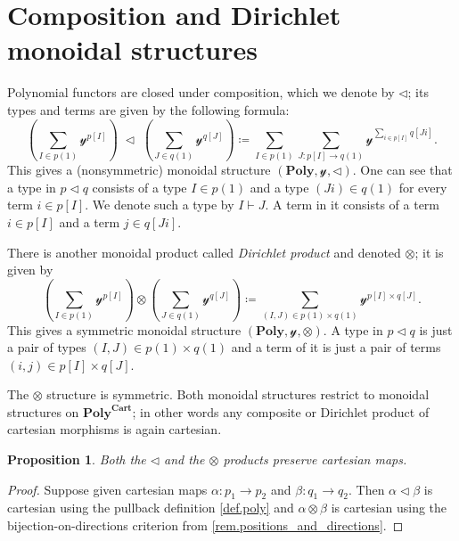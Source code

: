 \documentclass[11pt, one side, article]{memoir}
\theoremstyle{definition}
\theoremstyle{plain}
\newtheorem{proposition}[definitionx]{Proposition}
\newcommand{\Cat}[1]{\mathbf{#1}}%
\newcommand{\yon}{\mathcal{y}}
\newcommand{\poly}{\Cat{Poly}}
\newcommand{\polycart}{\poly^{\Cat{Cart}}}
\newcommand{\0}{\textsf{0}}
\newcommand{\1}{\tn{\textsf{1}}}
\newcommand{\tri}{\mathbin{\triangleleft}}
\begin{document}
\section{Composition and Dirichlet monoidal structures}

Polynomial functors are closed under composition, which we denote by $\tri$; its types and terms are given by the following formula:
\begin{equation}\label{eqn.comp_formula}
  \left(\sum_{I\in p(1)}\yon^{p[I]}\right)\;\tri\;
  \left(\sum_{J\in q(1)}\yon^{q[J]}\right)\coloneqq
  \sum_{I\in p(1)}\sum_{J\colon p[I]\to q(1)}\yon^{\sum_{i\in p[I]}q[J i]}.
\end{equation}
This gives a (nonsymmetric) monoidal structure $(\poly,\yon,\tri)$. One can see that a type in $p\tri q$ consists of a type $I\in p(1)$ and a type $(J i)\in q(1)$ for every term $i\in p[I]$. We denote such a type by $I\vdash J$. A term in it consists of a term $i\in p[I]$ and a term $j\in q[J i]$.

There is another monoidal product called \emph{Dirichlet product} and denoted $\otimes$; it is given by
\begin{equation}\label{eqn.dir_formula}
  \left(\sum_{I\in p(1)}\yon^{p[I]}\right)\otimes
  \left(\sum_{J\in q(1)}\yon^{q[J]}\right)\coloneqq
  \sum_{(I,J)\in p(1)\times q(1)}\yon^{p[I]\times q[J]}.
\end{equation}
This gives a symmetric monoidal structure $(\poly,\yon,\otimes)$. A type in $p\tri q$ is just a pair of types $(I,J)\in p(1)\times q(1)$ and a term of it is just a pair of terms $(i,j)\in p[I]\times q[J]$.

The $\otimes$ structure is symmetric. Both monoidal structures restrict to monoidal structures on $\polycart$; in other words any composite or Dirichlet product of cartesian morphisms is again cartesian.

\begin{proposition}\label{prop.tri_dir_cartesian}
Both the $\tri$ and the $\otimes$ products preserve cartesian maps.
\end{proposition}
\begin{proof}
Suppose given cartesian maps $\alpha\colon p_1\to p_2$ and $\beta\colon q_1\to q_2$. Then $\alpha\tri\beta$ is cartesian using the pullback definition \cref{def.poly} and $\alpha\otimes\beta$ is cartesian using the bijection-on-directions criterion from \cref{rem.positions_and_directions}.
\end{proof}
\end{document}
